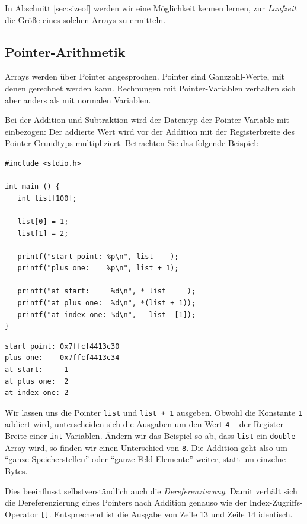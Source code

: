 In Abschnitt \ref{sec:sizeof} werden wir eine Möglichkeit kennen lernen, zur \emph{Laufzeit} die Größe eines solchen Arrays zu ermitteln.

\subsection{Pointer-Arithmetik}
Arrays werden über Pointer angesprochen. Pointer sind Ganzzahl-Werte, mit denen gerechnet werden kann. Rechnungen mit Pointer-Variablen verhalten sich aber anders als mit normalen Variablen.

Bei der Addition und Subtraktion wird der Datentyp der Pointer-Variable mit einbezogen: Der addierte Wert wird vor der Addition mit der Registerbreite des Pointer-Grundtyps multipliziert. Betrachten Sie das folgende Beispiel:

\begin{codebox}
\begin{verbatim}
#include <stdio.h>

int main () {
   int list[100];
   
   list[0] = 1;
   list[1] = 2;
   
   printf("start point: %p\n", list    );
   printf("plus one:    %p\n", list + 1);
   
   printf("at start:     %d\n", * list     );
   printf("at plus one:  %d\n", *(list + 1));
   printf("at index one: %d\n",   list  [1]);
}
\end{verbatim}
\end{codebox}

\begin{cmdbox}
\begin{verbatim}
start point: 0x7ffcf4413c30
plus one:    0x7ffcf4413c34
at start:     1
at plus one:  2
at index one: 2
\end{verbatim}
\end{cmdbox}

Wir lassen uns die Pointer \texttt{list} und \texttt{list + 1} ausgeben. Obwohl die Konstante \texttt{1} addiert wird, unterscheiden sich die Ausgaben um den Wert \texttt{4} -- der Register-Breite einer \texttt{int}-Variablen. Ändern wir das Beispiel so ab, dass \texttt{list} ein \texttt{double}-Array wird, so finden wir einen Unterschied von \texttt{8}. Die Addition geht also um \enquote{ganze Speicherstellen} oder \enquote{ganze Feld-Elemente} weiter, statt um einzelne Bytes.

Dies beeinflusst selbstverständlich auch die \emph{Dereferenzierung}. Damit verhält sich die Dereferenzierung eines Pointers nach Addition genauso wie der Index-Zugriffs-Operator \texttt{[]}. Entsprechend ist die Ausgabe von Zeile 13 und Zeile 14 identisch.

